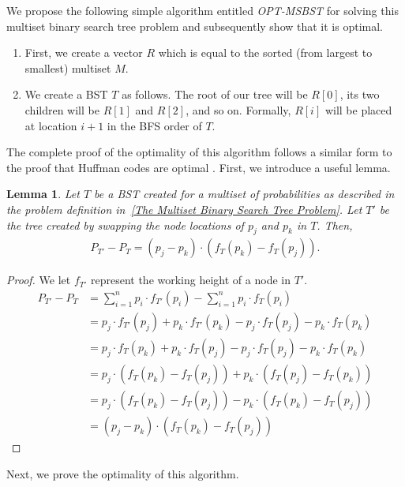\documentclass[letterpaper,12pt,titlepage,oneside,final]{book}
\theoremstyle{plain}
\newtheorem{lem}[thm]{Lemma}
\begin{document}
We propose the following simple algorithm entitled \textit{OPT-MSBST} for solving this multiset binary search tree problem and subsequently show that it is optimal.

\begin{enumerate}
\item First, we create a vector $R$ which is equal to the sorted (from largest to smallest) multiset $M$.

\item We create a BST $T$ as follows. The root of our tree will be $R[0]$, its two children will be $R[1]$ and $R[2]$, and so on. Formally, $R[i]$ will be placed at location $i+1$ in the BFS order of $T$.
\end{enumerate}

The complete proof of the optimality of this algorithm follows a similar form to the proof that Huffman codes are optimal \cite{huffman1952method}. First, we introduce a useful lemma.

\begin{lem}\label{MS Swap Lemma}
Let $T$ be a BST created for a multiset of probabilities as described in the problem definition in~\ref{The Multiset Binary Search Tree Problem}. Let $T'$ be the tree created by swapping the node locations of $p_j$ and $p_k$ in $T$. Then,
\begin{align*}
P_{T'}-P_T = (p_j - p_k)\cdot (f_T(p_k)-f_T(p_j)).
\end{align*}
\end{lem}

\begin{proof}
We let $f_{T'}$ represent the working height of a node in $T'$.
\begin{align*}
P_{T'}-P_T &= \sum_{i=1}^{n} p_i\cdot f_{T'}(p_i) - \sum_{i=1}^{n} p_i\cdot f_T(p_i) \\
&= p_j\cdot f_{T'}(p_j)+p_k\cdot f_{T'}(p_k) - p_j\cdot f_T(p_j) - p_k\cdot f_T(p_k)\\
&= p_j\cdot f_T(p_k)+p_k\cdot f_T(p_j) - p_j\cdot f_T(p_j) - p_k\cdot f_T(p_k)\\
&= p_j\cdot (f_T(p_k)-f_T(p_j)) + p_k \cdot (f_T(p_j) - f_T(p_k))\\
&= p_j\cdot (f_T(p_k)-f_T(p_j)) - p_k \cdot (f_T(p_k)-f_T(p_j))\\
&= (p_j - p_k)\cdot (f_T(p_k)-f_T(p_j))
\end{align*}

\end{proof}

Next, we prove the optimality of this algorithm. 
\end{document}
